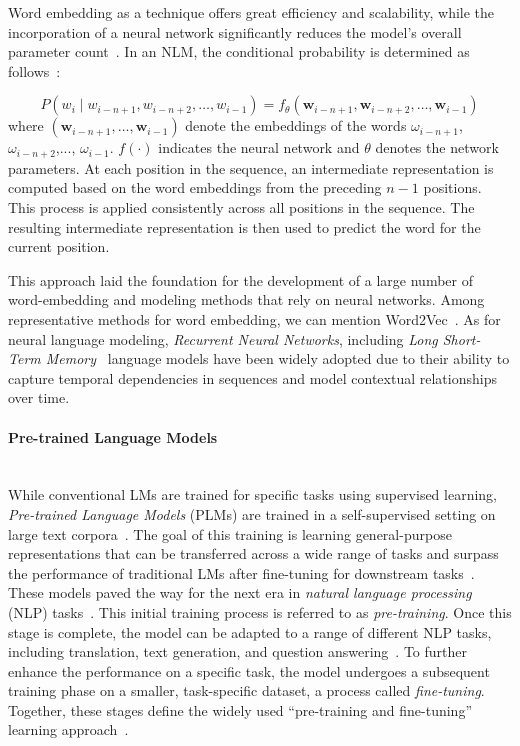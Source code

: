 \documentclass{DESSThesis}
\begin{document}
Word embedding as a technique offers great efficiency and scalability, while the incorporation of a neural network significantly reduces the model's overall parameter count~\cite{10.1145/3490443}. In an NLM, the conditional probability is determined as follows~\cite{10.1145/3490443}:

\begin{equation}
    P(w_i \mid w_{i-n+1}, w_{i-n+2}, \ldots, w_{i-1}) = f_{\theta}(\mathbf{w}_{i-n+1}, \mathbf{w}_{i-n+2}, \ldots, \mathbf{w}_{i-1})
\end{equation}
where $(\mathbf{w}_{i-n+1}, \ldots, \mathbf{w}_{i-1})$ denote the embeddings of the words $\omega_{i-n+1}$, $\omega_{i-n+2}$,..., $\omega_{i-1}$. $f(\cdot)$ indicates the neural network and $\theta$ denotes the network parameters. At each position in the sequence, an intermediate representation is computed based on the word embeddings from the preceding $n-1$ positions. This process is applied consistently across all positions in the sequence. The resulting intermediate representation is then used to predict the word for the current position.

This approach laid the foundation for the development of a large number of word-embedding and modeling methods that rely on neural networks. Among representative methods for word embedding, we can mention Word2Vec~\cite{mikolov2013efficientestimationwordrepresentations}. As for neural language modeling, \emph{Recurrent Neural Networks}, including \emph{Long Short-Term Memory}~\cite{10.1162/neco.1997.9.8.1735} language models have been widely adopted due to their ability to capture temporal dependencies in sequences and model contextual relationships over time.

\paragraph{Pre-trained Language Models}\mbox{}\\

\noindent While conventional LMs are trained for specific tasks using supervised learning, \emph{Pre-trained Language Models} (PLMs) are trained in a self-supervised setting on large text corpora~\cite{10.1145/3649449}. The goal of this training is learning general-purpose representations that can be transferred across a wide range of tasks and surpass the performance of traditional LMs after fine-tuning for downstream tasks~\cite{naveed2024comprehensiveoverviewlargelanguage}. These models paved the way for the next era in \emph{natural language processing} (NLP) tasks~\cite{review10433480}. This initial training process is referred to as \emph{pre-training}. Once this stage is complete, the model can be adapted to a range of different NLP tasks, including translation, text generation, and question answering~\cite{review10433480}. To further enhance the performance on a specific task, the model undergoes a subsequent training phase on a smaller, task-specific dataset, a process called \emph{fine-tuning}. Together, these stages define the widely used \enquote{pre-training and fine-tuning} learning approach~\cite{wang2024historydevelopmentprincipleslarge}. 
\end{document}
